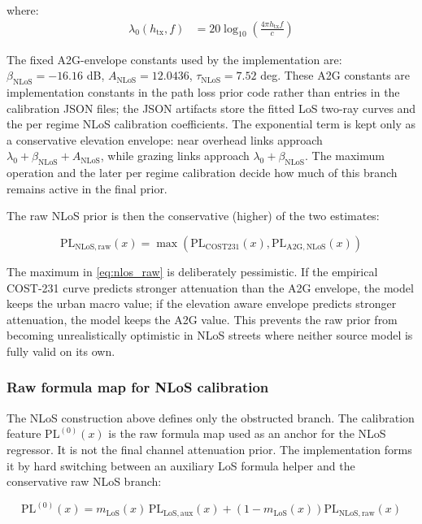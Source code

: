 where:
\begin{align}
\lambda_0(h_{\mathrm{tx}}, f)
&= 20\log_{10}\!\left(\frac{4\pi h_{\mathrm{tx}} f}{c}\right)
\label{eq:lambda0}
\end{align}

The fixed A2G-envelope constants used by the implementation are:
$\beta_{\mathrm{NLoS}} = -16.16$ dB,
$A_{\mathrm{NLoS}} = 12.0436$,
$\tau_{\mathrm{NLoS}} = 7.52$ deg.
These A2G constants are implementation constants in the path loss prior code
rather than entries in the calibration JSON files; the JSON artifacts store the
fitted LoS two-ray curves and the per regime NLoS calibration coefficients.
The exponential term is kept only as a conservative elevation envelope: near
overhead links approach \(\lambda_0+\beta_{\mathrm{NLoS}}+A_{\mathrm{NLoS}}\),
while grazing links approach \(\lambda_0+\beta_{\mathrm{NLoS}}\). The maximum
operation and the later per regime calibration decide how much of this branch
remains active in the final prior.

The raw NLoS prior is then the conservative (higher) of the two estimates:

\begin{equation}
\mathrm{PL}_{\mathrm{NLoS,raw}}(x)
=
\max\left(
\mathrm{PL}_{\mathrm{COST231}}(x),
\mathrm{PL}_{\mathrm{A2G,NLoS}}(x)
\right)
\label{eq:nlos_raw}
\end{equation}

The maximum in \eqref{eq:nlos_raw} is deliberately pessimistic. If the
empirical COST-231 curve predicts stronger attenuation than the A2G envelope,
the model keeps the urban macro value; if the elevation aware envelope predicts
stronger attenuation, the model keeps the A2G value. This prevents the raw
prior from becoming unrealistically optimistic in NLoS streets where neither
source model is fully valid on its own.

\subsubsection{Raw formula map for NLoS calibration}

The NLoS construction above defines only the obstructed branch. The
calibration feature \(\mathrm{PL}^{(0)}(x)\) is the raw formula map used as an
anchor for the NLoS regressor. It is not the final channel attenuation prior.
The implementation forms it by hard switching between an auxiliary LoS formula
helper and the conservative raw NLoS branch:

\begin{equation}
\mathrm{PL}^{(0)}(x)
=
m_{\mathrm{LoS}}(x)\,\mathrm{PL}_{\mathrm{LoS,aux}}(x)
+
\left(1-m_{\mathrm{LoS}}(x)\right)\mathrm{PL}_{\mathrm{NLoS,raw}}(x)
\label{eq:pl0}
\end{equation}


